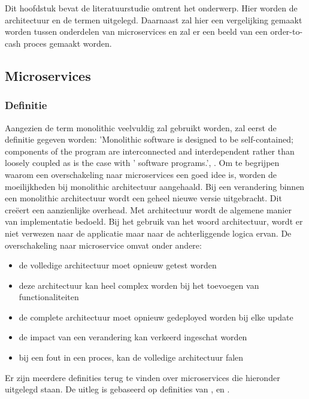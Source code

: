 \chapter{}
\label{ch:stand-van-zaken}



Dit hoofdstuk bevat de literatuurstudie omtrent het onderwerp. Hier worden de architectuur en de termen uitgelegd. Daarnaast zal hier een vergelijking gemaakt worden tussen onderdelen van microservices en zal er een beeld van een order-to-cash proces gemaakt worden.

\section{Microservices}
\subsection{Definitie}
Aangezien de term monolithic veelvuldig zal gebruikt worden, zal eerst de definitie gegeven worden:  'Monolithic software is designed to be self-contained; components of the program are interconnected and interdependent rather than loosely coupled as is the case with ' software programs.',  \textcite{Wigmore2016}.
Om te begrijpen waarom een overschakeling naar microservices een goed idee is, worden de moeilijkheden bij monolithic architectuur aangehaald. Bij een verandering binnen een monolithic architectuur wordt een geheel nieuwe versie uitgebracht. Dit creëert een aanzienlijke overhead. Met architectuur wordt de algemene manier van implementatie bedoeld. Bij het gebruik van het woord architectuur, wordt er niet verwezen naar de applicatie maar naar de achterliggende logica ervan.
De overschakeling naar microservice omvat onder andere:
\begin{itemize}
	\item de volledige architectuur moet opnieuw getest worden
	\item deze architectuur kan heel complex worden bij het toevoegen van functionaliteiten
	\item de complete architectuur moet opnieuw gedeployed worden bij elke update
	\item de impact van een verandering kan verkeerd ingeschat worden
	\item bij een fout in een proces, kan de volledige architectuur falen
\end{itemize}
Er zijn meerdere definities terug te vinden over microservices die hieronder uitgelegd staan. De uitleg is gebaseerd op definities van \textcite{Mauersberger2017}, \textcite{Watts2018} en \textcite{Benetis2016a}.

